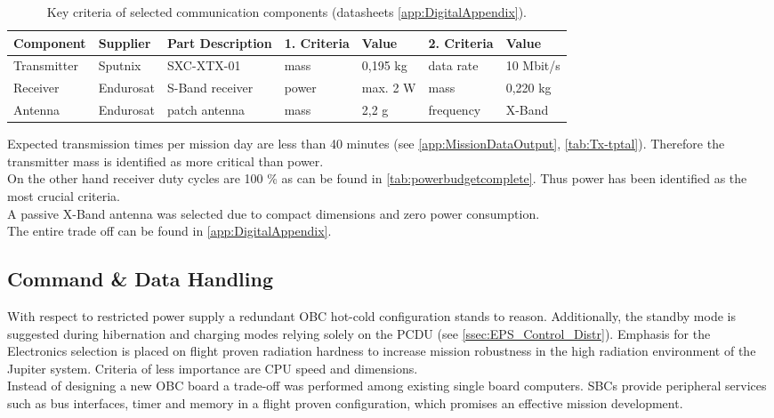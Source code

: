 \begin{table}[h]
\centering
\caption{Key criteria of selected communication components (datasheets \autoref{app:DigitalAppendix}).}
\begin{tabular}{lll|ll|ll}
\toprule
Component   & Supplier  & Part Description     & 1. Criteria   & Value    & 2. Criteria & Value          \\
\midrule
Transmitter & Sputnix   & SXC-XTX-01           & mass          & 0,195 kg & data rate   & 10 Mbit/s \\
Receiver    & Endurosat & S-Band receiver      & power         & max. 2 W & mass        & 0,220 kg       \\
Antenna     & Endurosat & patch antenna & mass          & 2,2 g    & frequency   & X-Band         \\
\bottomrule
\end{tabular}
\label{tab:ComCompComp}
\end{table}

Expected transmission times per mission day are less than 40 minutes (see \autoref{app:MissionDataOutput}, \autoref{tab:Tx-tptal}). Therefore the transmitter mass is identified as more critical than power. \\
On the other hand receiver duty cycles are 100 \% as can be found in \autoref{tab:powerbudgetcomplete}. Thus power has been identified as the most crucial criteria. \\
A passive X-Band antenna was selected due to compact dimensions and zero power consumption.  \\
The entire trade off can be found in \autoref{app:DigitalAppendix}.

 \subsection{Command \& Data Handling} \label{C&DH}
 
 With respect to restricted power supply a redundant OBC hot-cold configuration stands to reason. Additionally, the standby mode is suggested during hibernation and charging modes relying solely on the PCDU (see \autoref{ssec:EPS_Control_Distr}). 
Emphasis for the Electronics selection is placed on flight proven radiation hardness to increase mission robustness in the high radiation environment of the Jupiter system. 
Criteria of less importance are CPU speed and dimensions. \\

Instead of designing a new OBC board a trade-off was performed among existing single board computers. SBCs provide peripheral services such as bus interfaces, timer and memory in a flight proven configuration, which promises an effective mission development. \\


